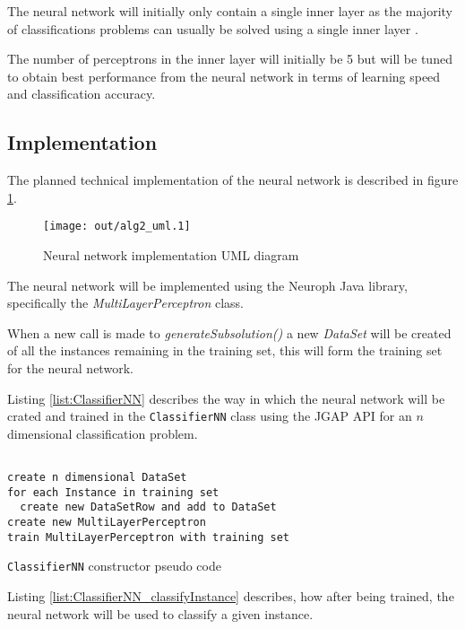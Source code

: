 \documentclass[a4paper]{article}
\begin{document}
The neural network will initially only contain a single inner layer as the
majority of classifications problems can usually be solved using a single inner
layer \cite{nninjava}.

The number of perceptrons in the inner layer will initially be 5 but will be
tuned to obtain best performance from the neural network in terms of learning
speed and classification accuracy.

\subsection{Implementation}

The planned technical implementation of the neural network is described in
figure \ref{fig:alg2_uml}.

\begin{figure}[h!]
  \centering
  \texttt{[image: out/alg2\_uml.1]}
  \caption{Neural network implementation UML diagram}
  \label{fig:alg2_uml}
\end{figure}

The neural network will be implemented using the Neuroph \cite{neuroph} Java
library, specifically the \textit{MultiLayerPerceptron} class.

When a new call is made to \textit{generateSubsolution()} a new \textit{DataSet}
will be created of all the instances remaining in the training set, this will
form the training set for the neural network.

Listing \ref{list:ClassifierNN} describes the way in which the neural network
will be crated and trained in the \texttt{ClassifierNN} class using the JGAP
API for an $n$ dimensional classification problem.

\begin{listing}[H]
  \begin{verbatim}

create n dimensional DataSet
for each Instance in training set
  create new DataSetRow and add to DataSet
create new MultiLayerPerceptron
train MultiLayerPerceptron with training set

  \end{verbatim}
  \caption{\texttt{ClassifierNN} constructor pseudo code}
  \label{list:ClassifierNN}
\end{listing}

Listing \ref{list:ClassifierNN_classifyInstance} describes, how after being
trained, the neural network will be used to classify a given instance.
\end{document}
